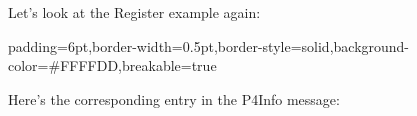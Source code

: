 \documentclass[11pt]{article}
\begin{document}
{%
\noindent{}Let's look at the Register example again:%

\begin{mdbmargintb}{6pt}{6pt}%
\begin{mdblock}{padding=6pt,border-width=0.5pt,border-style=solid,background-color=\#FFFFDD,breakable=true}%
\begin{mdpre}%
\end{mdpre}%
\end{mdblock}%
\end{mdbmargintb}%

\noindent{}Here's the corresponding entry in the P4Info message:%

}
\end{document}

